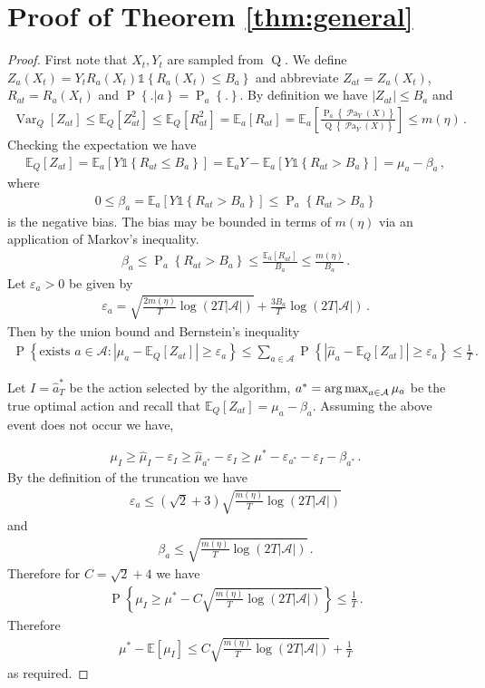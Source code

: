 \documentclass{article}
\newcommand{\Var}{\operatorname{Var}}
\newcommand{\set}[1]{\left\{#1\right\}}
\newcommand{\ind}[1]{\mathds{1}\!\!\set{#1}}
\newcommand{\argmax}{\operatornamewithlimits{arg\,max}}
\newcommand{\eq}[1]{\begin{align*}#1\end{align*}}
\renewcommand{\P}[1]{\operatorname{P}\left\{#1\right\}}
\newcommand{\Q}[1]{\operatorname{Q}\left\{#1\right\}}
\newcommand{\EE}{\mathbb E}
\newcommand{\EEa}{\EE_a}
\newcommand{\Pns}[2]{\operatorname{P}_{#1}\left\{#2\right\}}
\newcommand{\Pn}[2]{\operatorname{P}\left\{#2|#1\right\}}
\newcommand{\parents}[1]{\operatorname{\mathcal{P}a}_{#1}}
\newcommand{\calA}{\mathcal A}
\theoremstyle{plain}
\theoremstyle{definition}
\let\epsilon\varepsilon
\begin{document}
\section{Proof of Theorem \ref{thm:general}}\label{sec:thm:general}

\begin{proof}
First note that $X_t, Y_t$ are sampled from $\operatorname{Q}$.
We define $Z_a(X_t) = Y_t R_a(X_t)\ind{R_a(X_t)\leq B_a}$ and abbreviate $Z_{at} = Z_a(X_t)$, $R_{at} = R_a(X_t)$ and $\Pn{a}{.} = \Pns{a}{.}$.
By definition we have $|Z_{at}| \leq B_a$ and 
\eq{
\Var_Q[Z_{at}] 
\leq \EE_Q[Z_{at}^2] 
\leq \EE_Q[R_{at}^2]
= \EEa[R_{at}]
= \EEa\left[\frac{\Pns{a}{\parents{Y}(X)}}{\Q{\parents{Y}(X)}}\right] 
\leq m(\eta)\,.
}
Checking the expectation we have
\eq{
\EE_Q[Z_{at}] 
= \EEa \left[Y \ind{R_{at} \leq B_a}\right] 
= \EEa Y - \EEa \left[Y\ind{R_{at} > B_a}\right] 
= \mu_a - \beta_a\,,
}
where 
\eq{
0 \leq \beta_a = \EEa[Y \ind{R_{at} > B_a}] \leq \Pns{a}{R_{at} > B_a}
}
is the negative bias. 
The bias may be bounded in terms of $m(\eta)$ via an application of Markov's inequality.
\eq{
\beta_a \leq \Pns{a}{R_{at} > B_a} \leq \frac{\EEa[R_{at}]}{B_a} \leq \frac{m(\eta)}{B_a}\,.
}
Let $\epsilon_a > 0$ be given by
\eq{
\epsilon_a = \sqrt{\frac{2m(\eta)}{T} \log\left(2T|\calA|\right)} + \frac{3B_a}{T} \log\left(2T|\calA|\right)\,.
}
Then by the union bound and Bernstein's inequality 
\eq{
\P{\text{exists } a \in \calA : \left|\hat \mu_a - \EE_Q[Z_{at}]\right| \geq \epsilon_a} 
\leq \sum_{a \in \calA} \P{\left|\hat \mu_a - \EE_Q[Z_{at}]\right| \geq \epsilon_a} \leq \frac{1}{T}\,.
}

Let $I = \hat{a}^*_T$ be the action selected by the algorithm, $a^* = \argmax_{a \in \calA} \mu_a$ be the true optimal action and recall that $\EE_Q[Z_{at}] = \mu_a - \beta_a$. Assuming the above event does not occur we have,

\eq{
\mu_I \geq \hat \mu_I - \epsilon_I  
\geq \hat \mu_{a^*} - \epsilon_I  
\geq \mu^* - \epsilon_{a^*} - \epsilon_I - \beta_{a^*}\,. 
}
By the definition of the truncation
we have
\eq{
\epsilon_a \leq \left(\sqrt{2} + 3\right)\sqrt{\frac{m(\eta)}{T} \log\left(2T|\calA|\right)}
}
and
\eq{
\beta_a \leq \sqrt{\frac{m(\eta)}{T} \log\left(2T|\calA|\right)}\,. 
}
Therefore for $C = \sqrt{2} + 4$ we have
\eq{
\P{\mu_I \geq \mu^* - C \sqrt{\frac{m(\eta)}{T} \log\left(2T|\calA|\right)}} \leq \frac{1}{T}\,.
}
Therefore
\eq{
\mu^* - \EE[\mu_I] \leq C \sqrt{\frac{m(\eta)}{T} \log\left(2T|\calA|\right)} + \frac{1}{T}
}
as required.
\end{proof}
\end{document}
